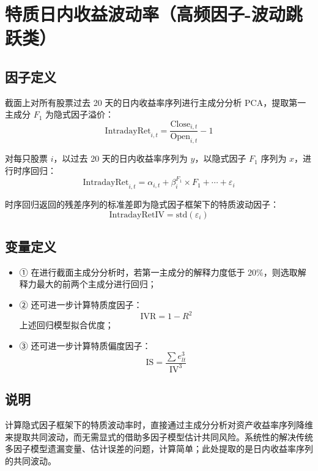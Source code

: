 \documentclass{article}
\begin{document}
\section{特质日内收益波动率（高频因子-波动跳跃类）}

\subsection{因子定义}

截面上对所有股票过去 20 天的日内收益率序列进行主成分分析 PCA，提取第一主成分 \( F_1 \) 为隐式因子溢价：
\begin{equation}
    \mathrm{IntradayRet}_{i,t} = \frac{\mathrm{Close}_{i,t}}{\mathrm{Open}_{i,t}} - 1
\end{equation}

对每只股票 \( i \)，以过去 20 天的日内收益率序列为 \( y \)，以隐式因子 \( F_1 \) 序列为 \( x \)，进行时序回归：
\begin{equation}
    \mathrm{IntradayRet}_{i,t} = \alpha_{i,t} + \beta_i^{F_1} \times F_1 + \cdots + \varepsilon_i
\end{equation}

时序回归返回的残差序列的标准差即为隐式因子框架下的特质波动因子：
\begin{equation}
    \mathrm{IntradayRetIV} = \mathrm{std}(\varepsilon_i)
\end{equation}

\subsection{变量定义}
\begin{itemize}
    \item ① 在进行截面主成分分析时，若第一主成分的解释力度低于 20\%，则选取解释力最大的前两个主成分进行回归；
    \item ② 还可进一步计算特质度因子：
        \begin{equation*}
            \mathrm{IVR} = 1 - R^2
        \end{equation*}
        上述回归模型拟合优度；
    \item ③ 还可进一步计算特质偏度因子：
        \begin{equation*}
            \mathrm{IS} = \frac{\sum e_{lt}^3}{\mathrm{IV}^3}
        \end{equation*}
\end{itemize}

\subsection{说明}
计算隐式因子框架下的特质波动率时，直接通过主成分分析对资产收益率序列降维来提取共同波动，而无需显式的借助多因子模型估计共同风险。系统性的解决传统多因子模型遗漏变量、估计误差的问题，计算简单；此处提取的是日内收益率序列的共同波动。
\end{document}
